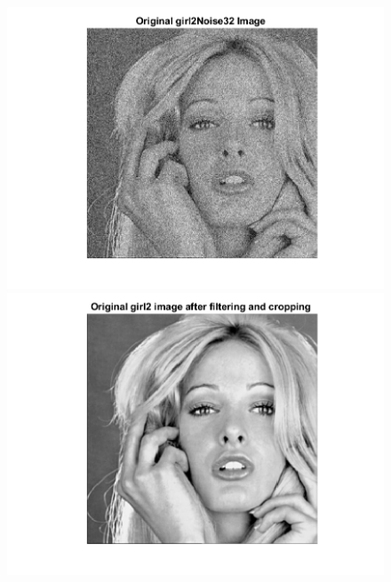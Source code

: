 \documentclass[11pt]{article} %
\begin{document}
\begin{figure}
 \centering
	\includegraphics{2dc.png}
	\includegraphics{2dd.png}
\end{figure}
\end{document}
